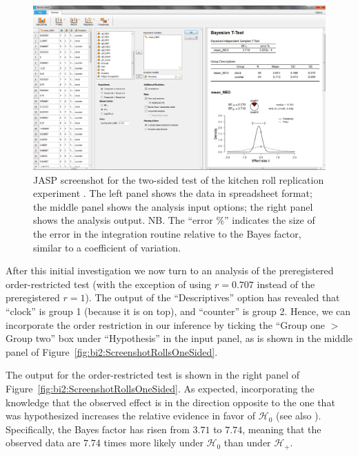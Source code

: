 \begin{figure}[tp]
    \begin{center}
        \includegraphics[width=.99\textwidth]{figs/bi2_ScreenshotRollsTwoSided.eps}
        \caption{JASP screenshot for the two-sided test of the kitchen roll replication experiment \protect\cite{WagenmakersEtAl2015Kitchen}. The left panel shows the data in spreadsheet format; the middle panel shows the analysis input options; the right panel shows the analysis output. NB. The ``error \%'' indicates the size of the error in the integration routine relative to the Bayes factor, similar to a coefficient of variation.} \label{fig:bi2:ScreenshotRollsTwoSided}
    \end{center}
\end{figure}

After this initial investigation we now turn to an analysis of the preregistered order-restricted test (with the exception of using $r=0.707$ instead of the preregistered $r=1$). The output of the ``Descriptives'' option has revealed that ``clock'' is group 1 (because it is on top), and ``counter'' is group 2. Hence, we can incorporate the order restriction in our inference by ticking the ``Group one $>$ Group two'' box under ``Hypothesis'' in the input panel, as is shown in the middle panel of Figure~\ref{fig:bi2:ScreenshotRollsOneSided}.

The output for the order-restricted test is shown in the right panel of Figure~\ref{fig:bi2:ScreenshotRollsOneSided}. As expected, incorporating the knowledge that the observed effect is in the direction opposite to the one that was hypothesized increases the relative evidence in favor of $\mathcal{H}_0$ (see also ). Specifically, the Bayes factor has risen from $3.71$ to $7.74$, meaning that the observed data are $7.74$ times more likely under $\mathcal{H}_0$ than under $\mathcal{H}_+$.

